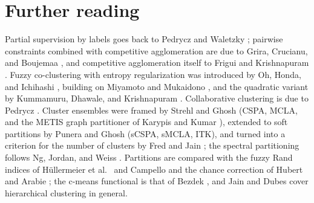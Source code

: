 \section{Further reading}\label{sec:beyond:reading}

Partial supervision by labels goes back to Pedrycz and Waletzky \cite{pedrycz:1997:ssfcm}; pairwise constraints combined with competitive agglomeration are due to Grira, Crucianu, and Boujemaa \cite{grira:2006:pcca}, and competitive agglomeration itself to Frigui and Krishnapuram \cite{frigui:1997:ca}. Fuzzy co-clustering with entropy regularization was introduced by Oh, Honda, and Ichihashi \cite{oh:2001:fccm}, building on Miyamoto and Mukaidono \cite{miyamoto:1997:entropy}, and the quadratic variant by Kummamuru, Dhawale, and Krishnapuram \cite{kummamuru:2003:codok}. Collaborative clustering is due to Pedrycz \cite{pedrycz:2002:collaborative}. Cluster ensembles were framed by Strehl and Ghosh \cite{strehl:2002:ensembles} (CSPA, MCLA, and the METIS graph partitioner of Karypis and Kumar \cite{karypis:1998:metis}), extended to soft partitions by Punera and Ghosh \cite{punera:2008:soft} (sCSPA, sMCLA, ITK), and turned into a criterion for the number of clusters by Fred and Jain \cite{fred:2005:eac}; the spectral partitioning follows Ng, Jordan, and Weiss \cite{ng:2002:spectral}. Partitions are compared with the fuzzy Rand indices of H\"ullermeier et al.\ \cite{hullermeier:2012:rand} and Campello \cite{campello:2007:rand} and the chance correction of Hubert and Arabie \cite{hubert:1985:ari}; the c-means functional is that of Bezdek \cite{bezdek:1981}, and Jain and Dubes \cite{jain:1988:book} cover hierarchical clustering in general.
